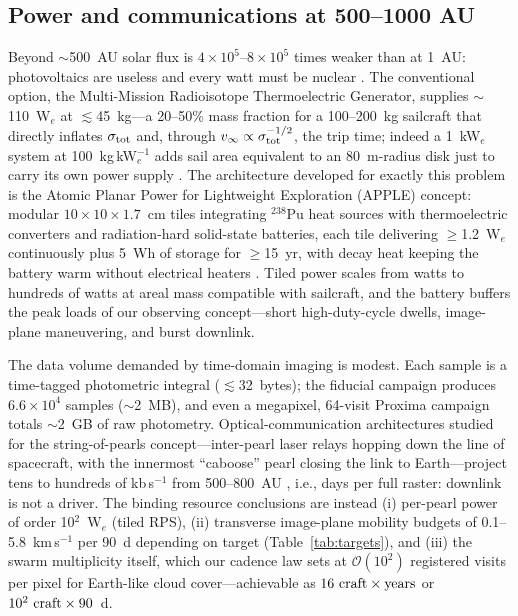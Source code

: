 ﻿\documentclass[twocolumn,10pt]{article}
\begin{document}
\subsection{Power and communications at 500--1000 AU}
\label{sec:power}

Beyond $\sim$500~AU solar flux is $4\times10^5$--$8\times10^5$ times
weaker than at 1~AU: photovoltaics are useless and every watt must be
nuclear \citep{tur26prop}. The conventional option, the Multi-Mission
Radioisotope Thermoelectric Generator, supplies $\sim$110~W$_e$ at
$\lesssim$45~kg---a 20--50\% mass fraction for a 100--200~kg sailcraft
that directly inflates $\sigma_{\rm tot}$ and, through
$v_\infty\propto\sigma_{\rm tot}^{-1/2}$, the trip time; indeed a 1~kW$_e$
system at 100~kg\,kW$_e^{-1}$ adds sail area equivalent to an 80~m-radius
disk just to carry its own power supply \citep{tur26prop}. The
architecture developed for exactly this problem is the Atomic Planar
Power for Lightweight Exploration (APPLE) concept: modular
$10\times10\times1.7$~cm tiles integrating $^{238}$Pu heat sources with
thermoelectric converters and radiation-hard solid-state batteries,
each tile delivering $\ge$1.2~W$_e$ continuously plus 5~Wh of storage
for $\ge$15~yr, with decay heat keeping the battery warm without
electrical heaters \citep{apple22,niac20}. Tiled power scales from watts
to hundreds of watts at areal mass compatible with sailcraft, and the
battery buffers the peak loads of our observing concept---short
high-duty-cycle dwells, image-plane maneuvering, and burst downlink.

The data volume demanded by time-domain imaging is modest. Each sample
is a time-tagged photometric integral ($\lesssim$32~bytes); the fiducial
campaign produces $6.6\times10^4$ samples ($\sim$2~MB), and even a
megapixel, 64-visit Proxima campaign totals $\sim$2~GB of raw
photometry. Optical-communication architectures studied for the
string-of-pearls concept---inter-pearl laser relays hopping down the
line of spacecraft, with the innermost ``caboose'' pearl closing the
link to Earth---project tens to hundreds of kb\,s$^{-1}$ from
500--800~AU \citep{helvajian23}, i.e., days per full raster: downlink
is not a driver. The binding resource conclusions are instead (i)
per-pearl power of order 10$^2$~W$_e$ (tiled RPS), (ii) transverse
image-plane mobility budgets of 0.1--5.8~km\,s$^{-1}$ per 90~d depending
on target (Table~\ref{tab:targets}), and (iii) the swarm multiplicity
itself, which our cadence law sets at $\mathcal{O}(10^2)$ registered
visits per pixel for Earth-like cloud cover---achievable as
$16\ {\rm craft}\times{\rm years}$ or $10^2\ {\rm craft}\times90$~d.
\end{document}

